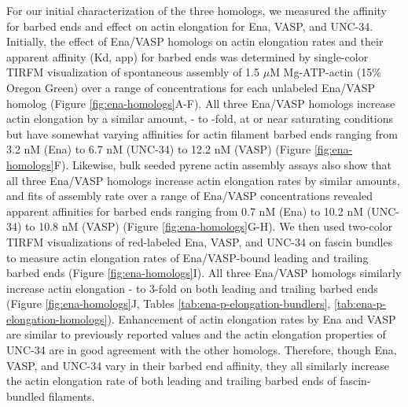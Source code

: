 For our initial characterization of the three homologs, we measured the affinity for barbed ends and effect on actin elongation for Ena, VASP, and UNC-34. Initially, the effect of Ena/VASP homologs on actin elongation rates and their apparent affinity (Kd, app) for barbed ends was determined by single-color TIRFM visualization of spontaneous assembly of 1.5 $\mu$M Mg-ATP-actin (15\% Oregon Green) over a range of concentrations for each unlabeled Ena/VASP homolog (Figure \ref{fig:ena-homologs}A-F). All three Ena/VASP homologs increase actin elongation by a similar amount, - to -fold, at or near saturating conditions but have somewhat varying affinities for actin filament barbed ends ranging from 3.2 nM (Ena) to 6.7 nM (UNC-34) to 12.2 nM (VASP) (Figure \ref{fig:ena-homologs}F). Likewise, bulk seeded pyrene actin assembly assays also show that all three Ena/VASP homologs increase actin elongation rates by similar amounts, and fits of assembly rate over a range of Ena/VASP concentrations revealed apparent affinities for barbed ends ranging from 0.7 nM (Ena) to 10.2 nM (UNC-34) to 10.8 nM (VASP) (Figure \ref{fig:ena-homologs}G-H). We then used two-color TIRFM visualizations of red-labeled Ena, VASP, and UNC-34 on fascin bundles to measure actin elongation rates of Ena/VASP-bound leading and trailing barbed ends (Figure \ref{fig:ena-homologs}I). All three Ena/VASP homologs similarly increase actin elongation - to 3-fold on both leading and trailing barbed ends (Figure \ref{fig:ena-homologs}J, Tables \ref{tab:ena-p-elongation-bundlers}, \ref{tab:ena-p-elongation-homologs}). Enhancement of actin elongation rates by Ena and VASP are similar to previously reported values \citep{hansen_vasp_2010,winkelman_ena/vasp_2014,bruhmann_distinct_2017} and the actin elongation properties of UNC-34 are in good agreement with the other homologs. Therefore, though Ena, VASP, and UNC-34 vary in their barbed end affinity, they all similarly increase the actin elongation rate of both leading and trailing barbed ends of fascin-bundled filaments.

